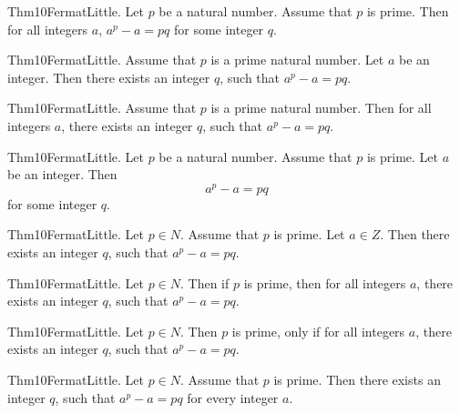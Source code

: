\documentclass{article}
\begin{document}
Thm10FermatLittle. Let $p$ be a natural number. Assume that $p$ is prime. Then for all integers $a$, $a ^ {p}- a = p q$ for some integer $q$.

Thm10FermatLittle. Assume that $p$ is a prime natural number. Let $a$ be an integer. Then there exists an integer $q$, such that $a ^ {p}- a = p q$.

Thm10FermatLittle. Assume that $p$ is a prime natural number. Then for all integers $a$, there exists an integer $q$, such that $a ^ {p}- a = p q$.

Thm10FermatLittle. Let $p$ be a natural number. Assume that $p$ is prime. Let $a$ be an integer. Then $$a ^ {p}- a = p q$$ for some integer $q$.

Thm10FermatLittle. Let $p \in N$. Assume that $p$ is prime. Let $a \in Z$. Then there exists an integer $q$, such that $a ^ {p}- a = p q$.

Thm10FermatLittle. Let $p \in N$. Then if $p$ is prime, then for all integers $a$, there exists an integer $q$, such that $a ^ {p}- a = p q$.

Thm10FermatLittle. Let $p \in N$. Then $p$ is prime, only if for all integers $a$, there exists an integer $q$, such that $a ^ {p}- a = p q$.

Thm10FermatLittle. Let $p \in N$. Assume that $p$ is prime. Then there exists an integer $q$, such that $a ^ {p}- a = p q$ for every integer $a$.
\end{document}
